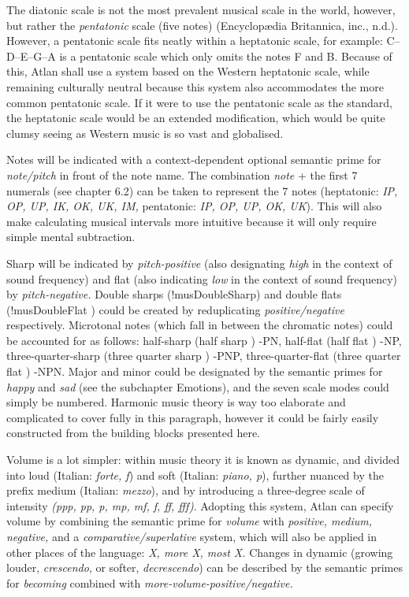 The diatonic scale is not the most prevalent musical scale in the world, however, but rather the \textit{pentatonic} scale (five notes) (Encyclop\ae dia Britannica, inc., n.d.). However, a pentatonic scale fits neatly within a heptatonic scale, for example: C–D–E–G–A is a pentatonic scale which only omits the notes F and B. Because of this, Atlan shall use a system based on the Western heptatonic scale, while remaining culturally neutral because this system also accommodates the more common pentatonic scale. If it were to use the pentatonic scale as the standard, the heptatonic scale would be an extended modification, which would be quite clumsy seeing as Western music is so vast and globalised. 

Notes will be indicated with a context-dependent optional semantic prime for \textit{note/pitch} in front of the note name. The combination {\it note} + the first 7 numerals (see chapter 6.2) can be taken to represent the 7 notes (heptatonic: \textit{IP, OP, UP, IK, OK, UK, IM,} pentatonic: \textit{IP, OP, UP, OK, UK}). This will also make calculating musical intervals more intuitive because it will only require simple mental subtraction. 

Sharp will be indicated by \textit{pitch-positive} (also designating \textit{high} in the context of sound frequency) and flat (also indicating \textit{low} in the context of sound frequency) by \textit{pitch-negative.} Double sharps (!musDoubleSharp) and double flats (!musDoubleFlat ) could be created by reduplicating \textit{positive/negative} respectively. Microtonal notes (which fall in between the chromatic notes) could be accounted for as follows: half-sharp (half sharp ) -PN, half-flat (half flat ) -NP, three-quarter-sharp (three quarter sharp ) -PNP, three-quarter-flat (three quarter flat ) -NPN. Major and minor could be designated by the semantic primes for \textit{happy} and \textit{sad} (see the subchapter Emotions), and the seven scale modes could simply be numbered. Harmonic music theory is way too elaborate and complicated to cover fully in this paragraph, however it could be fairly easily constructed from the building blocks presented here. 

Volume is a lot simpler: within music theory it is known as dynamic, and divided into loud (Italian: \textit{forte, f}) and soft (Italian: \textit{piano, p}), further nuanced by the prefix medium (Italian: \textit{mezzo}), and by introducing a three-degree scale of intensity \textit{(ppp, pp, p, mp, mf, f, ff, fff)}. Adopting this system, Atlan can specify volume by combining the semantic prime for \textit{volume} with \textit{positive, medium, negative,} and a \textit{comparative/superlative} system, which will also be applied in other places of the language: \textit{X, more X, most X.} Changes in dynamic (growing louder, \textit{crescendo}, or softer, \textit{decrescendo}) can be described by the semantic primes for \textit{becoming} combined with \textit{more-volume-positive/negative.} 

